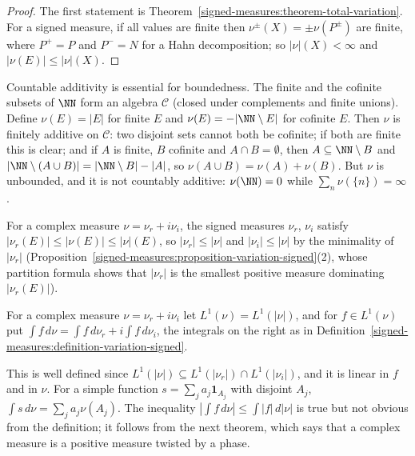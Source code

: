\begin{proof}
The first statement is Theorem~\ref{signed-measures:theorem-total-variation}. For a signed measure, if all values are finite then $\nu^\pm(X) = \pm\nu(P^\pm)$ are finite, where $P^+ = P$ and $P^- = N$ for
a Hahn decomposition; so $|\nu|(X) < \infty$ and $|\nu(E)| \leq |\nu|(X)$.
\end{proof}

\begin{counterexample}\label{signed-measures:counterexample-finitely-additive}
Countable additivity is essential for boundedness. The finite and the cofinite subsets of $\NN$ form an algebra $\mathcal{C}$ (closed under complements and finite unions). Define
$\nu(E) = |E|$ for finite $E$ and $\nu(E) = -|\NN \setminus E|$ for cofinite $E$. Then $\nu$ is finitely additive on $\mathcal{C}$: two disjoint sets cannot both be cofinite; if both are finite this is
clear; and if $A$ is finite, $B$ cofinite and $A \cap B = \emptyset$, then $A \subseteq \NN \setminus B$ and $|\NN \setminus (A \cup B)| = |\NN \setminus B| - |A|$, so $\nu(A \cup B) = \nu(A) + \nu(B)$.
But $\nu$ is unbounded, and it is not countably additive: $\nu(\NN) = 0$ while $\sum_n\nu(\{n\}) = \infty$.
\end{counterexample}

For a complex measure $\nu = \nu_r + i\nu_i$, the signed measures $\nu_r$, $\nu_i$ satisfy $|\nu_r(E)| \leq |\nu(E)| \leq |\nu|(E)$, so $|\nu_r| \leq |\nu|$ and $|\nu_i| \leq |\nu|$ by the minimality of
$|\nu_r|$ (Proposition~\ref{signed-measures:proposition-variation-signed}(2), whose partition formula shows that $|\nu_r|$ is the smallest positive measure dominating $|\nu_r(E)|$).

\begin{definition}\label{signed-measures:definition-complex-integral}
For a complex measure $\nu = \nu_r + i\nu_i$ let $L^1(\nu) = L^1(|\nu|)$, and for $f \in L^1(\nu)$ put $\int f\,d\nu = \int f\,d\nu_r + i\int f\,d\nu_i$, the integrals on the right as in
Definition~\ref{signed-measures:definition-variation-signed}.
\end{definition}

This is well defined since $L^1(|\nu|) \subseteq L^1(|\nu_r|) \cap L^1(|\nu_i|)$, and it is linear in $f$ and in $\nu$. For a simple function $s = \sum_ja_j\mathbf{1}_{A_j}$ with disjoint $A_j$,
$\int s\,d\nu = \sum_ja_j\nu(A_j)$. The inequality $|\int f\,d\nu| \leq \int|f|\,d|\nu|$ is true but not obvious from the definition; it follows from the next theorem, which says that a complex
measure is a positive measure twisted by a phase.


